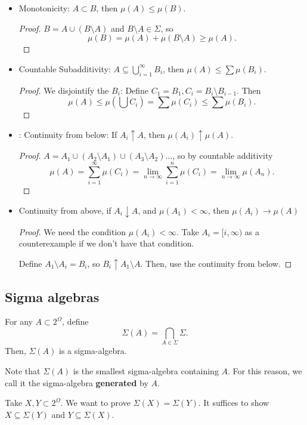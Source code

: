 \documentclass[11pt]{scrartcl}
\begin{document}
\begin{itemize}
\item Monotonicity: $A \subset B$, then $\mu(A) \le \mu(B)$. 
\begin{proof}
$B = A \cup (B\setminus A)$ and $B\setminus A \in \Sigma$, so $$\mu(B) = \mu(A) + \mu(B\setminus A) \ge \mu(A).$$
\end{proof}
\item Countable Subadditivity:  $A \subseteq \bigcup_{i=1}^\infty B_i$, then $\mu(A) \le \sum \mu(B_i)$.
\begin{proof}
We disjointify the $B_i$:  Define $C_1 = B_1, C_i = B_i \setminus B_{i-1}$.  Then
$$\mu(A) \le \mu(\bigcup C_i) = \sum \mu(C_i) \le \sum \mu(B_i).$$
\end{proof}
\item: Continuity from below:  If $A_i \uparrow A$, then $\mu(A_i) \uparrow \mu(A)$.
\begin{proof}
$A = A_1 \cup (A_2 \setminus A_1) \cup (A_3 \setminus A_2) \dots$, so by countable additivity
$$\mu(A) = \sum_{i=1}^{\infty} \mu(C_i) = \lim_{n\rightarrow \infty} \sum_{i=1}^n \mu(C_i) = \lim_{n \rightarrow \infty} \mu(A_n).$$
\end{proof}
\item Continuity from above, if $A_i \downarrow A$,  and $\mu(A_1) < \infty$, then $\mu(A_i) \rightarrow \mu(A)$ 
\begin{proof}
We need the condition $\mu(A_i) < \infty$.  Take $A_i = [i, \infty)$ as a counterexample if we don't have that condition.

Define $A_1 \setminus A_i = B_i$, so $B_i \uparrow A_1 \setminus A$.  Then, use the continuity from below.  
\end{proof}
\end{itemize}
\subsection{Sigma algebras}
\begin{fact} For any $A \subset 2^{\Omega}$, define $$\Sigma(A) = \bigcap_{A \in \Sigma}\Sigma.$$ Then, $\Sigma(A)$ is a sigma-algebra.
\end{fact}
Note that $\Sigma(A)$ is the smallest sigma-algebra containing $A$.  For this reason, we call it the sigma-algebra \textbf{generated} by $A$.

\begin{example} Take $X, Y \subset 2^{\Omega}$.  We want to prove $\Sigma(X) = \Sigma(Y)$.  It suffices to show $X \subseteq \Sigma(Y)$ and $Y \subseteq \Sigma(X)$.  
\end{example}
\end{document}
